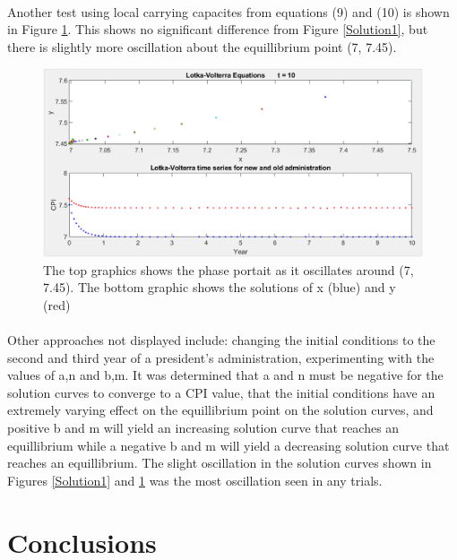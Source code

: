 \documentclass{article}
\begin{document}
	\paragraph{}
	Another test using local carrying capacites from equations (9) and (10) is shown in Figure \ref{Solution2}. This shows no significant difference from Figure \ref{Solution1}, but there is slightly more oscillation about the equillibrium point (7, 7.45).
	\begin{figure}[!]
	\centering
	\includegraphics[width=1\textwidth]{solution_local_k}
	\caption{The top graphics shows the phase portait as it oscillates around (7, 7.45). The bottom graphic shows the solutions of x (blue) and y (red)}
	\label{Solution2}
	\end{figure}

	\paragraph{}
	Other approaches not displayed include: changing the initial conditions to the second and third year of a president's administration, experimenting with the values of a,n and b,m. It was determined that a and n must be negative for the solution curves to converge to a CPI value, that the initial conditions have an extremely varying effect on the equillibrium point on the solution curves, and positive b and m will yield an increasing solution curve that reaches an equillibrium while a negative b and m will yield a decreasing solution curve that reaches an equillibrium. The slight oscillation in the solution curves shown in Figures \ref{Solution1} and \ref{Solution2} was the most oscillation seen in any trials.

	\section{Conclusions}
\end{document}

